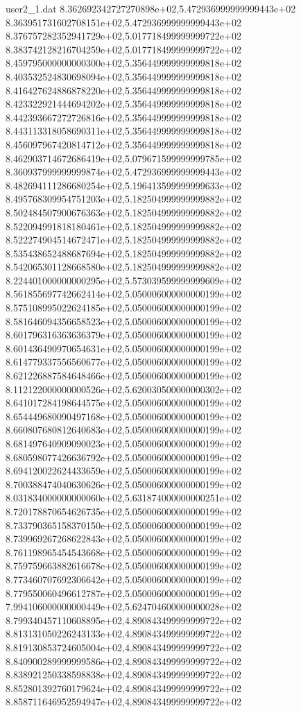 \begin{filecontents}{user2_1.dat}
8.362692342727270898e+02,5.472936999999999443e+02
8.363951731602708151e+02,5.472936999999999443e+02
8.376757282352941729e+02,5.017718499999999722e+02
8.383742128216704259e+02,5.017718499999999722e+02
8.459795000000000300e+02,5.356449999999999818e+02
8.403532524830698094e+02,5.356449999999999818e+02
8.416427624886878220e+02,5.356449999999999818e+02
8.423322921444694202e+02,5.356449999999999818e+02
8.442393667272726816e+02,5.356449999999999818e+02
8.443113318058690311e+02,5.356449999999999818e+02
8.456097967420814712e+02,5.356449999999999818e+02
8.462903714672686419e+02,5.079671599999999785e+02
8.360937999999999874e+02,5.472936999999999443e+02
8.482694111286680254e+02,5.196413599999999633e+02
8.495768309954751203e+02,5.182504999999999882e+02
8.502484507900676363e+02,5.182504999999999882e+02
8.522094991818180461e+02,5.182504999999999882e+02
8.522274904514672471e+02,5.182504999999999882e+02
8.535438652488687694e+02,5.182504999999999882e+02
8.542065301128668580e+02,5.182504999999999882e+02
8.224401000000000295e+02,5.573039599999999609e+02
8.561855697742662414e+02,5.050006000000000199e+02
8.575108995022624185e+02,5.050006000000000199e+02
8.581646094356658523e+02,5.050006000000000199e+02
8.601796316363636379e+02,5.050006000000000199e+02
8.601436490970654631e+02,5.050006000000000199e+02
8.614779337556560677e+02,5.050006000000000199e+02
8.621226887584648466e+02,5.050006000000000199e+02
8.112122000000000526e+02,5.620030500000000302e+02
8.641017284198644575e+02,5.050006000000000199e+02
8.654449680090497168e+02,5.050006000000000199e+02
8.660807680812640683e+02,5.050006000000000199e+02
8.681497640909090023e+02,5.050006000000000199e+02
8.680598077426636792e+02,5.050006000000000199e+02
8.694120022624433659e+02,5.050006000000000199e+02
8.700388474040630626e+02,5.050006000000000199e+02
8.031834000000000060e+02,5.631874000000000251e+02
8.720178870654626735e+02,5.050006000000000199e+02
8.733790365158370150e+02,5.050006000000000199e+02
8.739969267268622843e+02,5.050006000000000199e+02
8.761198965454543668e+02,5.050006000000000199e+02
8.759759663882616678e+02,5.050006000000000199e+02
8.773460707692306642e+02,5.050006000000000199e+02
8.779550060496612787e+02,5.050006000000000199e+02
7.994106000000000449e+02,5.624704600000000028e+02
8.799340457110608895e+02,4.890843499999999722e+02
8.813131050226243133e+02,4.890843499999999722e+02
8.819130853724605004e+02,4.890843499999999722e+02
8.840900289999999586e+02,4.890843499999999722e+02
8.838921250338598838e+02,4.890843499999999722e+02
8.852801392760179624e+02,4.890843499999999722e+02
8.858711646952594947e+02,4.890843499999999722e+02

\end{filecontents}
